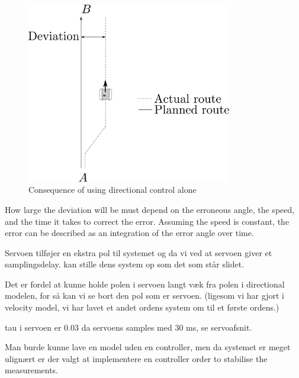 \begin{figure}[H]
	\centering
	\includegraphics[width=0.8\textwidth]{figures/steeringDeviation.pdf}
	\caption{Consequence of using directional control alone}
	\label{SteeringDeviation}
\end{figure}

How large the deviation will be must depend on the erroneous angle, the speed, and the time it takes to correct the error. Assuming the speed is constant, the error can be described as an integration of the error angle over time.




Servoen tilføjer en ekstra pol til systemet og da vi ved at servoen giver et samplingsdelay. kan stille dens system op som det som står slidet.

Det er fordel at kunne holde polen i servoen langt væk fra polen i directional modelen, for så kan vi se bort den pol som er servoen. (ligesom vi har gjort i velocity model, vi har lavet et andet ordens system om til et første ordens.)

tau i servoen er 0.03 da servoens samples med 30 ms, se servoafsnit.

Man burde kunne lave en model uden en controller, men da systemet er meget ulignært er der valgt at implementere en controller order to stabilise the measurements. 


 
 
 

